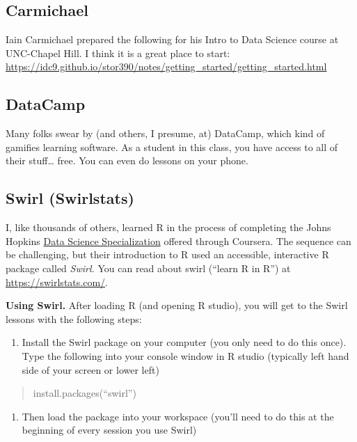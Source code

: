 \documentclass[openany]{book}
\providecommand{\tightlist}{%
  \setlength{\itemsep}{0pt}\setlength{\parskip}{0pt}}
\begin{document}
\hypertarget{carmichael}{%
\subsection{Carmichael}\label{carmichael}}

Iain Carmichael prepared the following for his Intro to Data Science course at UNC-Chapel Hill. I think it is a great place to start: \url{https://idc9.github.io/stor390/notes/getting_started/getting_started.html}

\hypertarget{datacamp}{%
\subsection{DataCamp}\label{datacamp}}

Many folks swear by (and others, I presume, at) DataCamp, which kind of gamifies learning software. As a student in this class, you have access to all of their stuff\ldots{} free. You can even do lessons on your phone.

\hypertarget{swirl-swirlstats}{%
\subsection{Swirl (Swirlstats)}\label{swirl-swirlstats}}

I, like thousands of others, learned R in the process of completing the Johns Hopkins \href{https://jhudatascience.org/courses.html}{Data Science Specialization} offered through Coursera. The sequence can be challenging, but their introduction to R used an accessible, interactive R package called \emph{Swirl.} You can read about swirl (``learn R in R'') at \url{https://swirlstats.com/}.

\textbf{Using Swirl.} After loading R (and opening R studio), you will get to the Swirl lessons with the following steps:

\begin{enumerate}
\def\labelenumi{\arabic{enumi})}
\tightlist
\item
  Install the Swirl package on your computer (you only need to do this once). Type the following into your console window in R studio (typically left hand side of your screen or lower left)
\end{enumerate}

\begin{quote}
install.packages(``swirl'')
\end{quote}

\begin{enumerate}
\def\labelenumi{\arabic{enumi})}
\setcounter{enumi}{1}
\tightlist
\item
  Then load the package into your workspace (you'll need to do this at the beginning of every session you use Swirl)
\end{enumerate}
\end{document}
